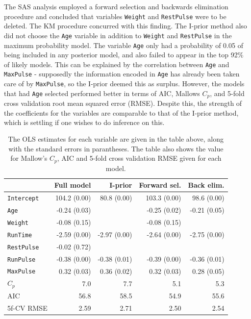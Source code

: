 The SAS analysis employed a forward selection and backwards elimination procedure and concluded that variables \texttt{Weight} and \texttt{RestPulse} were to be deleted. The KM procedure concurred with this finding. The I-prior method also did not choose the \texttt{Age} variable in addition to \texttt{Weight} and \texttt{RestPulse} in the maximum probability model. The variable \texttt{Age} only had a probability of 0.05 of being included in any posterior model, and also failed to appear in the top 92\% of likely models. This can be explained by the correlation between \texttt{Age} and \texttt{MaxPulse} - supposedly the information encoded in \texttt{Age} has already been taken care of by \texttt{MaxPulse}, so the I-prior deemed this as surplus. However, the models that had \texttt{Age} selected performed better in terms of AIC, Mallows $C_p$, and 5-fold cross validation root mean squared error (RMSE). Despite this, the strength of the coefficients for the variables are comparable to that of the I-prior method, which is settling if one wishes to do inference on this.

{\scriptsize
\begin{table}[H]
\centering
\begin{tabular}{l|rrrr}
					&\textbf{Full model}					
					&\textbf{I-prior}		
					&\textbf{Forward sel.}					
					&\textbf{Back elim.} \\
\hline
\texttt{Intercept}	&104.2 (0.00) 				&80.8 (0.00)		&103.3 (0.00) 				&98.6 (0.00) \\
\texttt{Age}			&-0.24 (0.03) 				&				&-0.25 (0.02) 				&-0.21 (0.05) \\
\texttt{Weight}		&{\color{gray!60}-0.08 (0.15)} 	&				&{\color{gray!60}-0.08 (0.15)} 	& \\
\texttt{RunTime}		&-2.59 (0.00) 				&-2.97 (0.00)	&-2.64 (0.00) 				&-2.75 (0.00) \\
\texttt{RestPulse}	&{\color{gray!60}-0.02 (0.72)} 	&				&			 					& \\
\texttt{RunPulse}		&-0.38 (0.00) 				&-0.38 (0.01)	&-0.39 (0.00) 				&-0.36 (0.01) \\ 
\texttt{MaxPulse}		&0.32 (0.03) 				&0.36 (0.02)	&0.32 (0.03) 					&0.28 (0.05) \\
\hline
$C_p$				&7.0 		&7.7		&5.1 		&5.3 \\
AIC					&56.8 		&58.5 	&54.9 		&55.6 \\
5f-CV RMSE		&2.59		&2.71 	&2.50		&2.54 \\
\end{tabular}
\caption{The OLS estimates for each variable are given in the table above, along with the standard errors in parantheses. The table also shows the value for Mallow's $C_p$, AIC and 5-fold cross validation RMSE given for each model.}
\end{table}
}
	

